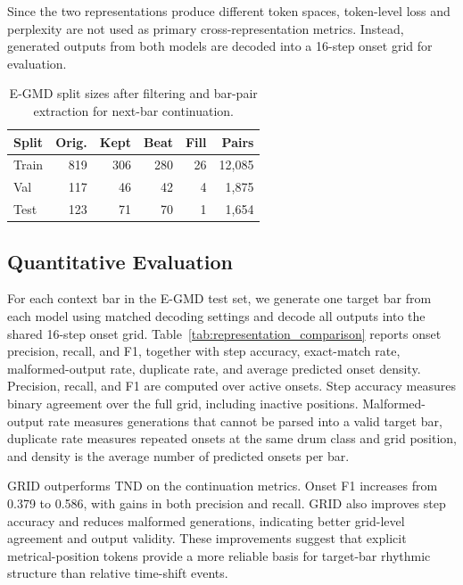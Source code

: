 \documentclass{article}
\begin{document}
Since the two representations produce different token spaces, token-level loss and perplexity are not used as primary cross-representation metrics. Instead, generated outputs from both models are decoded into a 16-step onset grid for evaluation.

\begin{table}[t]
\centering
\small
\setlength{\tabcolsep}{6pt}
\begin{tabular}{lrrrrr}
\toprule
Split & Orig. & Kept & Beat & Fill & Pairs \\
\midrule
Train & 819 & 306 & 280 & 26 & 12,085 \\
Val & 117 & 46 & 42 & 4 & 1,875 \\
Test & 123 & 71 & 70 & 1 & 1,654 \\
\bottomrule
\end{tabular}
\caption{E-GMD split sizes after filtering and bar-pair extraction for next-bar continuation.}
\label{tab:egmd-summary}
\end{table}



\subsection{Quantitative Evaluation}\label{subsec:quantitative_evaluation}
For each context bar in the E-GMD test set, we generate one target bar from each model using matched decoding settings and decode all outputs into the shared 16-step onset grid. Table~\ref{tab:representation_comparison} reports onset precision, recall, and F1, together with step accuracy, exact-match rate, malformed-output rate, duplicate rate, and average predicted onset density. Precision, recall, and F1 are computed over active onsets. Step accuracy measures binary agreement over the full grid, including inactive positions. Malformed-output rate measures generations that cannot be parsed into a valid target bar, duplicate rate measures repeated onsets at the same drum class and grid position, and density is the average number of predicted onsets per bar.

GRID outperforms TND on the continuation metrics. Onset F1 increases from 0.379 to 0.586, with gains in both precision and recall. GRID also improves step accuracy and reduces malformed generations, indicating better grid-level agreement and output validity. These improvements suggest that explicit metrical-position tokens provide a more reliable basis for target-bar rhythmic structure than relative time-shift events.
\end{document}
